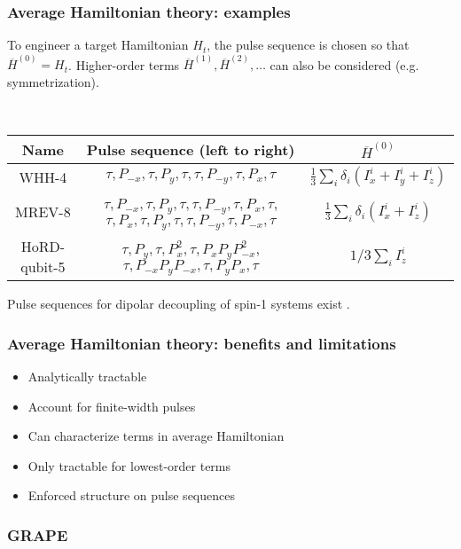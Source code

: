 \documentclass{beamer}
\begin{document}
\begin{frame}
\frametitle{Average Hamiltonian theory: examples}

To engineer a target Hamiltonian $H_t$, the pulse sequence is chosen so that $\overline{H}^{(0)} = H_t$. Higher-order terms $\overline{H}^{(1)}, \overline{H}^{(2)}, \dots$ can also be considered (e.g. symmetrization).

~

\begin{tabularx}{\linewidth}{c c c}
    Name & Pulse sequence (left to right) & $\overline{H}^{(0)}$ \\
    \hline
    WHH-4 \cite{PhysRevLett.20.180} &
        $\tau, P_{-x}, \tau, P_y, \tau, \tau, P_{-y}, \tau, P_x, \tau$ &
        $\frac{1}{3} \sum_i \delta_i \left( I_x^i + I_y^i + I_z^i \right)$ \\
    MREV-8 \cite{mansfield1971symmetrized} &
        $\tau, P_{-x}, \tau, P_y, \tau, \tau, P_{-y}, \tau, P_x, \tau$,
        $\tau, P_{x}, \tau, P_y, \tau, \tau, P_{-y}, \tau, P_{-x}, \tau$ &
        $\frac{1}{3} \sum_i \delta_i \left( I_x^i + I_z^i \right)$ \\
    HoRD-qubit-5 \cite{O_Keeffe_2019} &
        $\tau, P_y, \tau, P_x^2, \tau, P_x P_y P_{-x}^2$,
        $\tau, P_{-x} P_y P_{-x}, \tau, P_y P_x, \tau$ &
        $1/3 \sum_i I_z^i$ \\
    \hline
\end{tabularx}

Pulse sequences for dipolar decoupling of spin-1 systems exist \cite{PhysRevLett.119.183603, O_Keeffe_2019}.

\end{frame}

\begin{frame}
\frametitle{Average Hamiltonian theory: benefits and limitations}

\begin{itemize}
    \item Analytically tractable
    \item Account for finite-width pulses
    \item Can characterize terms in average Hamiltonian
    \pause
    \item Only tractable for lowest-order terms
    \item Enforced structure on pulse sequences
\end{itemize}

\end{frame}

\begin{frame}
\frametitle{GRAPE}


\end{frame}
\end{document}
